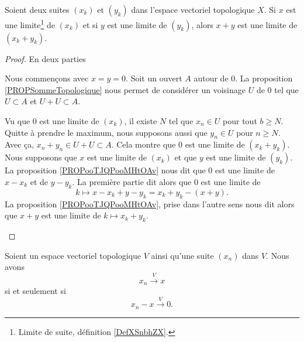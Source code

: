 \begin{proposition}		\label{PROPooQIQSooHbNkIy}
	Soient deux suites \( (x_k)\) et \( (y_k)\) dans l'espace vectoriel topologique \( X\). Si \( x\) est une limite\footnote{Limite de suite, définition \ref{DefXSnbhZX}.} de \( (x_k)\) et si \( y\) est une limite de \( (y_k)\), alors \( x+y\) est une limite de \( (x_k+y_k)\).
\end{proposition}

\begin{proof}
	En deux parties
	\begin{subproof}
		\spitem[Le cas \( x=y=0\)]
		Nous commençons avec \( x=y=0\). Soit un ouvert \( A\) autour de \( 0\). La proposition \ref{PROPSommeTopologique} nous permet de considérer un voisinage \( U\) de \( 0\) tel que \( U\subset A\) et \( U+U\subset A\).

		Vu que \( 0\) est une limite de \( (x_k)\), il existe \( N\) tel que \( x_n\in U\) pour tout \( b\geq N\). Quitte à prendre le maximum, nous supposons aussi que \( y_n\in U\) pour \( n\geq N\). Avec ça, \( x_n+y_n\in U+U\subset A\). Cela montre que \( 0\) est une limite de \( (x_k+y_k)\).
		Nous supposons que \( x\) est une limite de \( (x_k)\) et que \( y\) est une limite de \( (y_k)\). La proposition \ref{PROPooTJQPooMHtOAv} nous dit que \( 0\) est une limite de \( x-x_k\) et de \( y-y_k\). La première partie dit alors que \( 0\) est une limite de
		\begin{equation}
			k\mapsto x-x_k+y-y_k=x_k+y_k-(x+y).
		\end{equation}
		La proposition \ref{PROPooTJQPooMHtOAv}, prise dans l'autre sens nous dit alors que \( x+y\) est une limite de \( k\mapsto x_k+y_k\).
	\end{subproof}
\end{proof}


\begin{lemma}       \label{LEMooJDJVooHUKdSe}
	Soient un espace vectoriel topologique \( V\) ainsi qu'une suite \( (x_n)\) dans \( V\). Nous avons
	\begin{equation}
		x_n\stackrel{V}{\longrightarrow}x
	\end{equation}
	si et seulement si
	\begin{equation}
		x_n-x\stackrel{V}{\longrightarrow}0.
	\end{equation}
\end{lemma}

